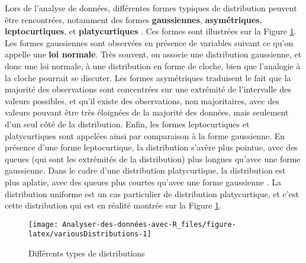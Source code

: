 \documentclass[
]{book}
\begin{document}
Lors de l'analyse de données, différentes formes typiques de distribution peuvent être rencontrées, notamment des formes \textbf{gaussiennes}, \textbf{asymétriques}, \textbf{leptocurtiques}, et \textbf{platycurtiques} \autocite{dartCommentDecrireDistribution2003}. Ces formes sont illustrées sur la Figure \ref{fig:variousDistributions}. Les formes gaussiennes sont observées en présence de variables suivant ce qu'on appelle une \textbf{loi normale}. Très souvent, on associe une distribution gaussienne, et donc une loi normale, à une distribution en forme de cloche, bien que l'analogie à la cloche pourrait se discuter. Les formes asymétriques traduisent le fait que la majorité des observations sont concentrées sur une extrémité de l'intervalle des valeurs possibles, et qu'il existe des observations, non majoritaires, avec des valeurs pouvant être très éloignées de la majorité des données, mais seulement d'un seul côté de la distribution. Enfin, les formes leptocurtiques et platycurtiques sont appelées ainsi par comparaison à la forme gaussienne. En présence d'une forme leptocurtique, la distribution s'avère plus pointue, avec des queues (qui sont les extrémités de la distribution) plus longues qu'avec une forme gaussienne. Dans le cadre d'une distribution platycurtique, la distribution est plus aplatie, avec des queues plus courtes qu'avec une forme gaussienne \autocite{dartCommentDecrireDistribution2003}. La distribution uniforme est un cas particulier de distribution platycurtique, et c'est cette distribution qui est en réalité montrée sur la Figure \ref{fig:variousDistributions}.

\begin{figure}

{\centering \texttt{[image: Analyser-des-données-avec-R\_files/figure-latex/variousDistributions-1]} 

}

\caption{Différents types de distributions}\label{fig:variousDistributions}
\end{figure}
\end{document}
